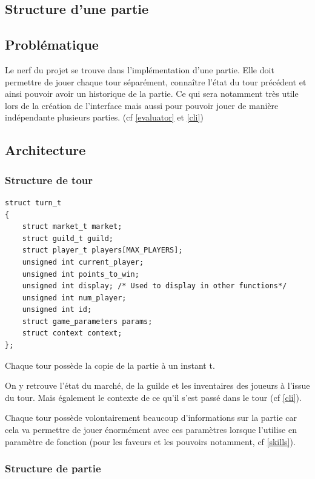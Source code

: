\subsection*{Structure d'une partie}

\label{game}

\subsection*{Problématique}

Le nerf du projet se trouve dans l'implémentation d'une partie. Elle doit permettre de jouer chaque tour séparément, connaître l'état du tour précédent et ainsi pouvoir avoir un historique de la partie. Ce qui sera notamment très utile lors de la création de l'interface mais aussi pour pouvoir jouer de manière indépendante plusieurs parties. (cf \ref{evaluator} et \ref{cli})
\subsection*{Architecture}

\subsubsection*{Structure de tour}

\begin{lstlisting}[frame=single, caption={Implémentation de la structure turn\_t}]
struct turn_t
{
	struct market_t market;
	struct guild_t guild;
	struct player_t players[MAX_PLAYERS];
	unsigned int current_player;
	unsigned int points_to_win;
	unsigned int display; /* Used to display in other functions*/
	unsigned int num_player;
	unsigned int id;
	struct game_parameters params;
	struct context context;
};
\end{lstlisting}

Chaque tour possède la copie de la partie à un instant t.

On y retrouve l'état du marché, de la guilde et les inventaires des joueurs à l'issue du tour. Mais également le contexte de ce qu'il s'est passé dans le tour (cf \ref{cli}).

Chaque tour possède volontairement beaucoup d'informations sur la partie car cela va permettre de jouer énormément avec ces paramètres lorsque l'utilise en paramètre de fonction (pour les faveurs et les pouvoirs notamment, cf \ref{skills}).

\subsubsection*{Structure de partie}

